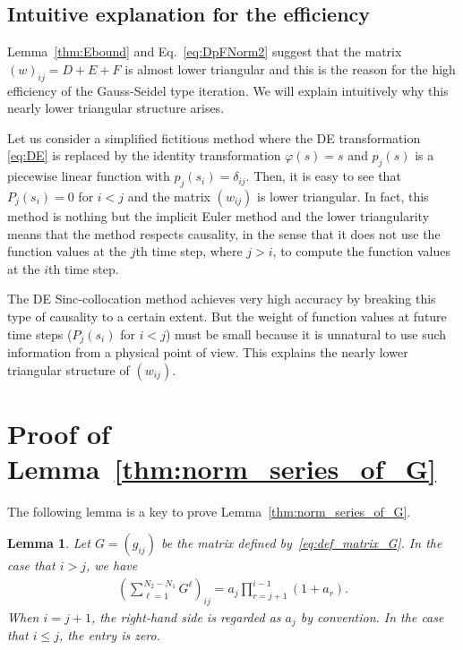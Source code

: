 \documentclass[pdflatex,sn-mathphys-num]{sn-jnl}%
\theoremstyle{thmstyleone}%
\theoremstyle{thmstyletwo}%
\newtheorem{lemma}{Lemma}%
\theoremstyle{thmstylethree}%
\begin{document}
\subsection{Intuitive explanation for the efficiency}
Lemma~\ref{thm:Ebound} and 
Eq.~\eqref{eq:DpFNorm2} suggest that the matrix $(w)_{ij}=D+E+F$ is almost lower triangular and this is the reason for the high efficiency of the Gauss-Seidel type iteration. We will explain intuitively why this nearly lower triangular structure arises.

Let us consider a simplified fictitious method where the DE transformation \eqref{eq:DE} is replaced by the identity transformation $\varphi(s)=s$ and $p_j(s)$ is a piecewise linear function with $p_j(s_i)=\delta_{ij}$. Then, it is easy to see that $P_j(s_i)=0$ for $i<j$ and the matrix $(w_{ij})$ is lower triangular. In fact, this method is nothing but the implicit Euler method and the lower triangularity means that the method respects causality, in the sense that it does not use the function values at the $j$th time step, where $j>i$, to compute the function values at the $i$th time step.

The DE Sinc-collocation method achieves very high accuracy by breaking this type of causality to a certain extent. But the weight of function values at future time steps ($P_j(s_i)$ for $i<j$) must be small because it is unnatural to use such information from a physical point of view. This explains the nearly lower triangular structure of $(w_{ij})$.



\section{Proof of Lemma~\ref{thm:norm_series_of_G}}
\label{sec:proof_norm_series_of_G}

The following lemma is a key to prove Lemma~\ref{thm:norm_series_of_G}. 

\begin{lemma}
\label{thm:calc_series_of_G}
Let $G = (g_{ij})$ be the matrix defined by~\eqref{eq:def_matrix_G}. 
In the case that $i>j$, we have
\begin{align}
\left(  \sum_{\ell=1}^{N_{2} - N_{1}} G^{\ell} \right)_{ij}
= a_j\prod_{r=j+1}^{i-1}(1+a_r).
\label{eq:calc_series_of_G}
\end{align}
When $i = j+1$, the right-hand side is regarded as $a_{j}$ by convention. 
In the case that $i\le j$, the entry is zero. 
\end{lemma}
\end{document}
